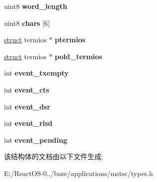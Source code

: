 \begin{DoxyCompactItemize}
\mbox{\label{structrdpdr__serial__device__info_abf011392cb718f9ac3a2280567eb9e91}} 
uint8 {\bfseries word\+\_\+length}
\item 
\mbox{\label{structrdpdr__serial__device__info_a3543abcf995ba61a9bd357f8f79ea3b1}} 
uint8 {\bfseries chars} \mbox{[}6\mbox{]}
\item 
\mbox{\label{structrdpdr__serial__device__info_a00d2aabc114e4de778d8ca5c8d84241e}} 
\hyperlink{interfacestruct}{struct} termios $\ast$ {\bfseries ptermios}
\item 
\mbox{\label{structrdpdr__serial__device__info_a24392c97414a7e343fa8c92c5aed70d5}} 
\hyperlink{interfacestruct}{struct} termios $\ast$ {\bfseries pold\+\_\+termios}
\item 
\mbox{\label{structrdpdr__serial__device__info_acfd6d476202916ef7075055fb401deba}} 
int {\bfseries event\+\_\+txempty}
\item 
\mbox{\label{structrdpdr__serial__device__info_ac23ddbe8f24a7af98f7a360e455906cf}} 
int {\bfseries event\+\_\+cts}
\item 
\mbox{\label{structrdpdr__serial__device__info_a508637d4736eef71c23e0757af6be4ad}} 
int {\bfseries event\+\_\+dsr}
\item 
\mbox{\label{structrdpdr__serial__device__info_a68796268fdacb2bb53476cfa9cc279e2}} 
int {\bfseries event\+\_\+rlsd}
\item 
\mbox{\label{structrdpdr__serial__device__info_a32faf5e4977198d60736e7838eae8315}} 
int {\bfseries event\+\_\+pending}
\end{DoxyCompactItemize}


该结构体的文档由以下文件生成\+:\begin{DoxyCompactItemize}
\item 
E\+:/\+React\+O\+S-\/0../base/applications/mstsc/types.\+h\end{DoxyCompactItemize}
